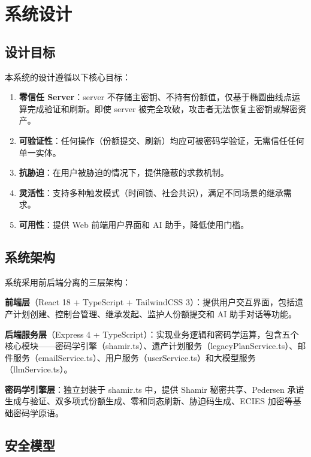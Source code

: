 \section{系统设计}

\subsection{设计目标}

本系统的设计遵循以下核心目标：

\begin{enumerate}[label=(\arabic*)]
    \item \textbf{零信任 Server}：server 不存储主密钥、不持有份额值，仅基于椭圆曲线点运算完成验证和刷新。即使 server 被完全攻破，攻击者无法恢复主密钥或解密资产。
    \item \textbf{可验证性}：任何操作（份额提交、刷新）均应可被密码学验证，无需信任任何单一实体。
    \item \textbf{抗胁迫}：在用户被胁迫的情况下，提供隐蔽的求救机制。
    \item \textbf{灵活性}：支持多种触发模式（时间锁、社会共识），满足不同场景的继承需求。
    \item \textbf{可用性}：提供 Web 前端用户界面和 AI 助手，降低使用门槛。
\end{enumerate}

\subsection{系统架构}

系统采用前后端分离的三层架构：

\textbf{前端层}（React 18 + TypeScript + TailwindCSS 3）：提供用户交互界面，包括遗产计划创建、控制台管理、继承发起、监护人份额提交和 AI 助手对话等功能。

\textbf{后端服务层}（Express 4 + TypeScript）：实现业务逻辑和密码学运算，包含五个核心模块——密码学引擎（shamir.ts）、遗产计划服务（legacyPlanService.ts）、邮件服务（emailService.ts）、用户服务（userService.ts）和大模型服务（llmService.ts）。

\textbf{密码学引擎层}：独立封装于 shamir.ts 中，提供 Shamir 秘密共享、Pedersen 承诺生成与验证、双多项式份额生成、零和同态刷新、胁迫码生成、ECIES 加密等基础密码学原语。

\subsection{安全模型}

